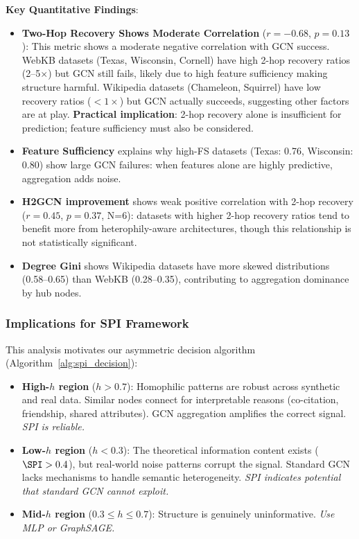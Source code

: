 \textbf{Key Quantitative Findings}:
\begin{itemize}
    \item \textbf{Two-Hop Recovery Shows Moderate Correlation} ($r = -0.68$, $p = 0.13$): This metric shows a moderate negative correlation with GCN success. WebKB datasets (Texas, Wisconsin, Cornell) have high 2-hop recovery ratios (2--5$\times$) but GCN still fails, likely due to high feature sufficiency making structure harmful. Wikipedia datasets (Chameleon, Squirrel) have low recovery ratios ($<1\times$) but GCN actually succeeds, suggesting other factors are at play. \textbf{Practical implication}: 2-hop recovery alone is insufficient for prediction; feature sufficiency must also be considered.
    \item \textbf{Feature Sufficiency} explains why high-FS datasets (Texas: 0.76, Wisconsin: 0.80) show large GCN failures: when features alone are highly predictive, aggregation adds noise.
    \item \textbf{H2GCN improvement} shows weak positive correlation with 2-hop recovery ($r = 0.45$, $p = 0.37$, N=6): datasets with higher 2-hop recovery ratios tend to benefit more from heterophily-aware architectures, though this relationship is not statistically significant.
    \item \textbf{Degree Gini} shows Wikipedia datasets have more skewed distributions (0.58--0.65) than WebKB (0.28--0.35), contributing to aggregation dominance by hub nodes.
\end{itemize}

\subsubsection{Implications for SPI Framework}

This analysis motivates our asymmetric decision algorithm (Algorithm~\ref{alg:spi_decision}):

\begin{itemize}
    \item \textbf{High-$h$ region} ($h > 0.7$): Homophilic patterns are robust across synthetic and real data. Similar nodes connect for interpretable reasons (co-citation, friendship, shared attributes). GCN aggregation amplifies the correct signal. \textit{SPI is reliable.}

    \item \textbf{Low-$h$ region} ($h < 0.3$): The theoretical information content exists ($\SPI > 0.4$), but real-world noise patterns corrupt the signal. Standard GCN lacks mechanisms to handle semantic heterogeneity. \textit{SPI indicates potential that standard GCN cannot exploit.}

    \item \textbf{Mid-$h$ region} ($0.3 \leq h \leq 0.7$): Structure is genuinely uninformative. \textit{Use MLP or GraphSAGE.}
\end{itemize}

